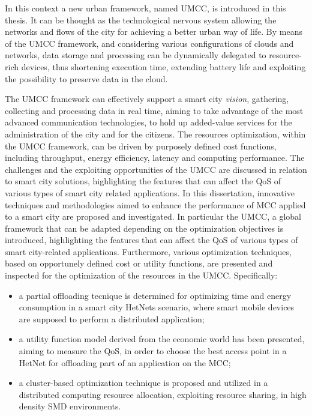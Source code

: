 \documentclass[twoside,openright]{report}
\begin{document}
In this context a new urban framework, named \gls{UMCC}, is introduced in this thesis.  It can be thought as the technological nervous system allowing the networks and flows of the city for achieving a better urban way of life. 
By means of the \gls{UMCC} framework, and considering various configurations of clouds and networks, data storage and processing can be dynamically delegated to resource-rich devices, thus shortening execution time, extending battery life and exploiting the possibility to preserve data in the cloud.

The \gls{UMCC} framework can effectively support a smart city \emph{vision}, gathering, collecting and processing data in real time, aiming to take advantage of the most advanced communication technologies, to hold up added-value services for the administration of the city and for the citizens. 
The resources optimization, within the \gls{UMCC} framework, can be driven by purposely defined cost functions, including throughput, energy efficiency, latency and computing performance. 
The challenges and the exploiting opportunities of  the \gls{UMCC} are discussed in relation to smart city solutions, highlighting the features that can affect the \gls{QoS} of various types of smart city related applications.
In this dissertation, innovative techniques and methodologies aimed to enhance the performance of \gls{MCC} applied to a smart city are proposed and investigated.
In particular the \gls{UMCC}, a global framework that can be adapted depending on the optimization objectives is introduced, highlighting the features that can affect the \gls{QoS} of various types of smart city-related applications.
Furthermore, various optimization techniques, based on opportunely defined cost or utility functions, are presented and inspected for the optimization of the resources in the \gls{UMCC}.
Specifically:
\begin{itemize}
\item a partial offloading tecnique is determined for optimizing time and energy consumption in a smart city \glspl{HetNet} scenario, where smart mobile devices are supposed to perform a distributed application;
\item
a utility function model derived from the economic world has been presented, aiming to measure the \gls{QoS}, in order to choose the best access point in a \gls{HetNet} for offloading part of an application on the \gls{MCC};
\item 
a cluster-based optimization technique is proposed and utilized in a distributed computing resource allocation, exploiting resource sharing, in high density \gls{SMD} environments.
\end{itemize}
\end{document}
